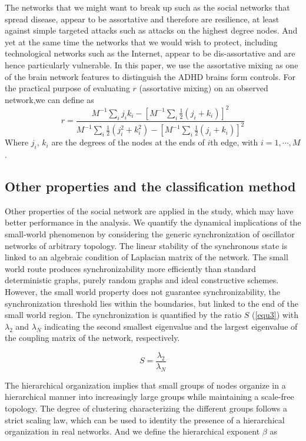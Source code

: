 \documentclass{llncs}
\begin{document}
The networks that we might want to break up such as the social networks that spread disease, appear to be assortative and therefore are resilience, at least against simple targeted attacks such as attacks on the highest degree nodes. And yet at the same time the networks that we would wish to protect, including technological networks such as the Internet, appear to be dis-assortative and are hence particularly vulnerable\cite{25}. In this paper, we use the assortative mixing as one of the brain network features to distinguish the ADHD brains form controls. For the practical purpose of evaluating $r$ (assortative mixing) on an observed network,we can define as
\begin{equation}
r = \frac{M^{-1}\sum_ij_ik_i-[M^{-1}\sum_i\frac{1}{2}(j_i+k_i)]^2}
{M^{-1}\sum_i\frac{1}{2}(j_i^2+k_i^2)-[M^{-1}\sum_i\frac{1}{2}(j_i+k_i)]^2}
\end{equation}
Where $j_i$, $k_i$ are the degrees of the nodes at the ends of $i$th edge, with $i = 1,\cdots,M$.


\subsection{Other properties and the classification method}
Other properties of the social network are applied in the study, which may have better performance in the analysis. We quantify the dynamical implications of the small-world phenomenon by considering the generic synchronization of oscillator networks of arbitrary topology. The linear stability of the synchronous state is linked to an algebraic condition of Laplacian matrix of the network. The small world route produces synchronizability more efficiently than standard deterministic graphs, purely random graphs and ideal constructive schemes. However, the small world property does not guarantee synchronizability, the synchronization threshold lies within the boundaries, but linked to the end of the small world region\cite{26}. The synchronization is quantified by the ratio $S$ (\ref{equ3}) with $\lambda_2$ and $\lambda_N$ indicating the second smallest eigenvalue and the largest eigenvalue of the coupling matrix of the network, respectively.

\begin{equation}
\label{equ3}
S = \frac{\lambda_2}{\lambda_N}
\end{equation}



The hierarchical organization implies that small groups of nodes organize in a hierarchical manner into increasingly large groups while maintaining a scale-free topology. The degree of clustering characterizing the different groups follows a strict scaling law, which can be used to identity the presence of a hierarchical organization in real networks\cite{27}. And we define the hierarchical exponent $\beta$ as
\end{document}
